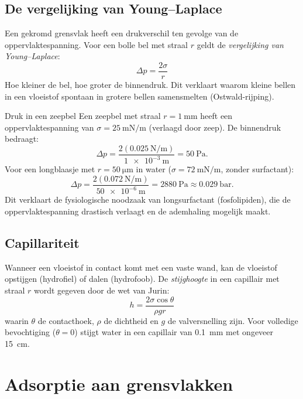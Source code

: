 \subsection{De vergelijking van Young--Laplace}

Een gekromd grensvlak heeft een drukverschil ten gevolge van de oppervlaktespanning. Voor een bolle bel met straal $r$ geldt de \emph{vergelijking van Young--Laplace}:
\begin{equation}
\boxed{\;\Delta p = \frac{2\sigma}{r}\;}
\label{eq:young-laplace}
\end{equation}
Hoe kleiner de bel, hoe groter de binnendruk. Dit verklaart waarom kleine bellen in een vloeistof spontaan in grotere bellen samensmelten (Ostwald-rijping).

\begin{voorbeeld}{Druk in een zeepbel}
Een zeepbel met straal $r = \SI{1}{\milli\metre}$ heeft een oppervlaktespanning van $\sigma = \SI{25}{\milli\newton\per\metre}$ (verlaagd door zeep). De binnendruk bedraagt:
\[
\Delta p = \frac{2(\SI{0.025}{\newton\per\metre})}{\SI{1e-3}{\metre}} = \SI{50}{\pascal}.
\]
Voor een longblaasje met $r = \SI{50}{\micro\metre}$ in water ($\sigma = \SI{72}{\milli\newton\per\metre}$, zonder surfactant):
\[
\Delta p = \frac{2(\SI{0.072}{\newton\per\metre})}{\SI{50e-6}{\metre}} = \SI{2880}{\pascal} \approx \SI{0.029}{\bar}.
\]
Dit verklaart de fysiologische noodzaak van longsurfactant (fosfolipiden), die de oppervlaktespanning drastisch verlaagt en de ademhaling mogelijk maakt.
\end{voorbeeld}

\subsection{Capillariteit}

Wanneer een vloeistof in contact komt met een vaste wand, kan de vloeistof opstijgen (hydrofiel) of dalen (hydrofoob). De \emph{stijghoogte} in een capillair met straal $r$ wordt gegeven door de wet van Jurin:
\begin{equation}
\boxed{\;h = \frac{2\sigma \cos\theta}{\rho g r}\;}
\end{equation}
waarin $\theta$ de contacthoek, $\rho$ de dichtheid en $g$ de valversnelling zijn. Voor volledige bevochtiging ($\theta = 0$) stijgt water in een capillair van \SI{0.1}{\milli\metre} met ongeveer \SI{15}{\centi\metre}.

\section{Adsorptie aan grensvlakken}
\label{sec:adsorptie-grensvlakken}

